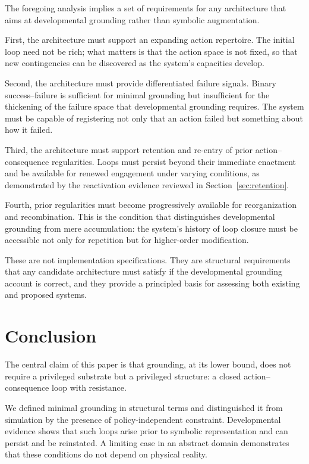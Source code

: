 \documentclass[11pt]{article}
\begin{document}
The foregoing analysis implies a set of requirements for any
architecture that aims at developmental grounding rather than symbolic
augmentation.

First, the architecture must support an expanding action repertoire.
The initial loop need not be rich; what matters is that the action
space is not fixed, so that new contingencies can be discovered as the
system's capacities develop.

Second, the architecture must provide differentiated failure signals.
Binary success--failure is sufficient for minimal grounding but
insufficient for the thickening of the failure space that
developmental grounding requires. The system must be capable of
registering not only that an action failed but something about how it
failed.

Third, the architecture must support retention and re-entry of prior
action--consequence regularities. Loops must persist beyond their
immediate enactment and be available for renewed engagement under
varying conditions, as demonstrated by the reactivation evidence
reviewed in Section~\ref{sec:retention}.

Fourth, prior regularities must become progressively available for
reorganization and recombination. This is the condition that
distinguishes developmental grounding from mere accumulation: the
system's history of loop closure must be accessible not only for
repetition but for higher-order modification.

These are not implementation specifications. They are structural
requirements that any candidate architecture must satisfy if the
developmental grounding account is correct, and they provide a
principled basis for assessing both existing and proposed systems.

\section{Conclusion}
\label{sec:conclusion}

The central claim of this paper is that grounding, at its lower bound,
does not require a privileged substrate but a privileged structure: a
closed action--consequence loop with resistance.

We defined minimal grounding in structural terms and distinguished it
from simulation by the presence of policy-independent constraint.
Developmental evidence shows that such loops arise prior to symbolic
representation and can persist and be reinstated. A limiting case in
an abstract domain demonstrates that these conditions do not depend on
physical reality.
\end{document}
